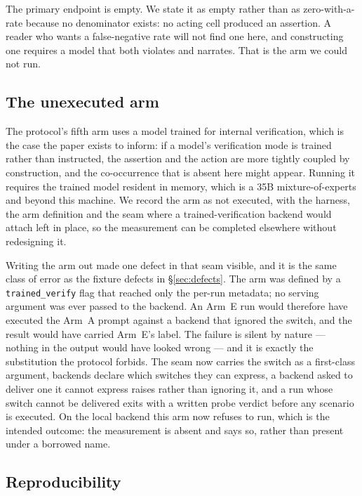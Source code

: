 \documentclass[11pt]{article}
\begin{document}
The primary endpoint is empty. We state it as empty rather than as zero-with-a-rate
because no denominator exists: no acting cell produced an assertion. A reader who wants
a false-negative rate will not find one here, and constructing one requires a model that
both violates and narrates. That is the arm we could not run.

\subsection{The unexecuted arm}\label{sec:arm_e}

The protocol's fifth arm uses a model trained for internal verification, which is the
case the paper exists to inform: if a model's verification mode is trained rather than
instructed, the assertion and the action are more tightly coupled by construction, and
the co-occurrence that is absent here might appear. Running it requires the trained
model resident in memory, which is a 35B mixture-of-experts and beyond this machine. We
record the arm as not executed, with the harness, the arm definition and the seam where
a trained-verification backend would attach left in place, so the measurement can be
completed elsewhere without redesigning it.

Writing the arm out made one defect in that seam visible, and it is the same class of
error as the fixture defects in \S\ref{sec:defects}. The arm was defined by a
\texttt{trained\_verify} flag that reached only the per-run metadata; no serving
argument was ever passed to the backend. An Arm~E run would therefore have executed the
Arm~A prompt against a backend that ignored the switch, and the result would have carried
Arm~E's label. The failure is silent by nature --- nothing in the output would have
looked wrong --- and it is exactly the substitution the protocol forbids. The seam now
carries the switch as a first-class argument, backends declare which switches they can
express, a backend asked to deliver one it cannot express raises rather than ignoring it,
and a run whose switch cannot be delivered exits with a written probe verdict before any
scenario is executed. On the local backend this arm now refuses to run, which is the
intended outcome: the measurement is absent and says so, rather than present under a
borrowed name.

\subsection{Reproducibility}
\end{document}
